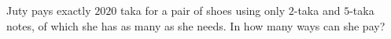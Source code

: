 Juty pays exactly $2020$ taka for a pair of shoes using only $2$-taka and $5$-taka notes, of which she has as many as she needs. In how many ways can she pay?
